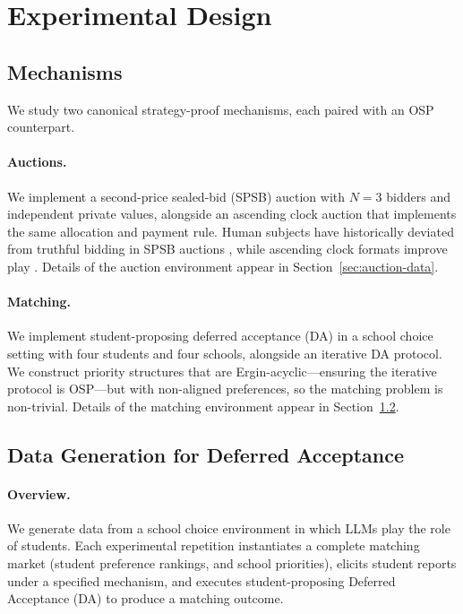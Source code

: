 \documentclass[format=acmsmall, review=false]{acmart}
\begin{document}
\section{Experimental Design} \label{sec:methods}


\subsection{Mechanisms}

We study two canonical strategy-proof mechanisms, each paired with an OSP counterpart.

\paragraph{Auctions.} We implement a second-price sealed-bid (SPSB) auction with $N=3$ bidders and independent private values, alongside an ascending clock auction that implements the same allocation and payment rule. Human subjects have historically deviated from truthful bidding in SPSB auctions \citep{kagel1993independent, kagel1995individual}, while ascending clock formats improve play \citep{li2017obviously, breitmoser2022obviousness}. Details of the auction environment appear in Section~\ref{sec:auction-data}.

\paragraph{Matching.} We implement student-proposing deferred acceptance (DA) in a school choice setting with four students and four schools, alongside an iterative DA protocol. We construct priority structures that are Ergin-acyclic---ensuring the iterative protocol is OSP---but with non-aligned preferences, so the matching problem is non-trivial. Details of the matching environment appear in Section~\ref{sec:da-data}.


\subsection{Data Generation for Deferred Acceptance} \label{sec:da-data}
\paragraph{Overview.}
We generate data from a school choice environment in which LLMs play the role of students. Each experimental repetition instantiates a complete matching market (student preference rankings, and school priorities), elicits student reports under a specified mechanism, and  executes student-proposing Deferred Acceptance (DA) to produce a
matching outcome. 
\end{document}
